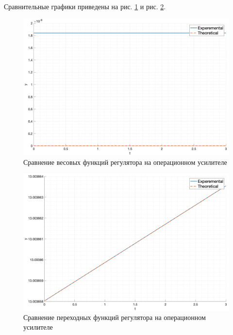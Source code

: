 Сравнительные графики приведены на рис. \ref{fig:task5_impulse_response_cmp} и рис. \ref{fig:task5_step_response_cmp}.
\begin{figure}[ht!]
    \centering
    \includegraphics[width=\textwidth]{media/plots/task5_impulse_response_cmp.png}
    \caption{Сравнение весовых функций регулятора на операционном усилителе}
    \label{fig:task5_impulse_response_cmp}
\end{figure}
\begin{figure}[ht!]
    \centering
    \includegraphics[width=\textwidth]{media/plots/task5_step_response_cmp.png}
    \caption{Сравнение переходных функций регулятора на операционном усилителе}
    \label{fig:task5_step_response_cmp}
\end{figure}

\FloatBarrier
